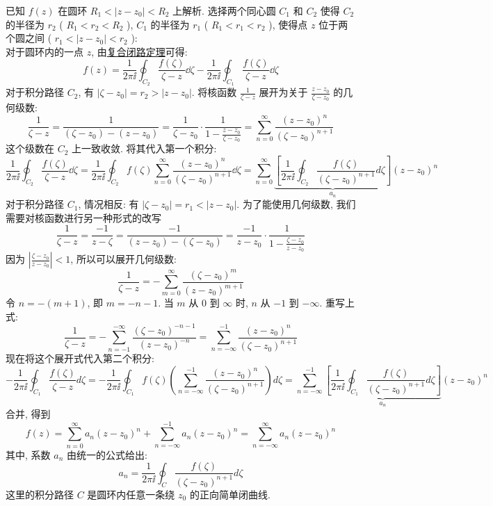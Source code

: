 \documentclass[UTF8]{ctexart}
\begin{document}
        \begin{prf}
            已知  \(f(z)\)  在圆环  \(R_1 < |z - z_0| < R_2\)  上解析. 选择两个同心圆  \(C_1\)  和  \(C_2\)  使得  \(C_2\)  的半径为  \(r_2\)  ( \(R_1 < r_2 < R_2\) ),  \(C_1\)  的半径为  \(r_1\)  ( \(R_1 < r_1 < r_2\) ), 使得点  \(z\)  位于两个圆之间 ( \(r_1 < |z - z_0| < r_2\) ):\\
            对于圆环内的一点  \(z\), 由\hyperref[thm:CombinedClosedCircuit]{复合闭路定理}可得: 
            \[f(z) = \frac{1}{2\pi\ii} \oint_{C_2} \frac{f(\zeta)}{\zeta - z} \dd\zeta - \frac{1}{2\pi\ii} \oint_{C_1} \frac{f(\zeta)}{\zeta - z}  \dd\zeta\]
            对于积分路径  \(C_2\), 有  \(|\zeta - z_0| = r_2 > |z - z_0|\). 将核函数  \(\frac{1}{\zeta - z}\)  展开为关于  \(\frac{z-z_0}{\zeta-z_0}\)  的几何级数: 
            \[\frac{1}{\zeta - z} = \frac{1}{(\zeta - z_0) - (z - z_0)} = \frac{1}{\zeta - z_0} \cdot \frac{1}{1 - \frac{z-z_0}{\zeta-z_0}} = \sum_{n=0}^{\infty} \frac{(z - z_0)^n}{(\zeta - z_0)^{n+1}}\]
            这个级数在  \(C_2\)  上一致收敛. 将其代入第一个积分: 
            \[\frac{1}{2\pi\ii} \oint_{C_2} \frac{f(\zeta)}{\zeta - z} \dd\zeta = \frac{1}{2\pi\ii} \oint_{C_2} f(\zeta) \sum_{n=0}^{\infty} \frac{(z - z_0)^n}{(\zeta - z_0)^{n+1}} \dd\zeta = \sum_{n=0}^{\infty} \underbrace{\left[ \frac{1}{2\pi\ii} \oint_{C_2} \frac{f(\zeta)}{(\zeta - z_0)^{n+1}} d\zeta \right]}_{a_n} (z - z_0)^n\]
            对于积分路径  \(C_1\), 情况相反: 有  \(|\zeta - z_0| = r_1 < |z - z_0|\). 为了能使用几何级数, 我们需要对核函数进行另一种形式的改写
            \[\frac{1}{\zeta - z} = \frac{-1}{z - \zeta} = \frac{-1}{(z - z_0) - (\zeta - z_0)} = \frac{-1}{z - z_0} \cdot \frac{1}{1 - \frac{\zeta-z_0}{z-z_0}}\]
            因为  \(\left| \frac{\zeta-z_0}{z-z_0} \right| < 1\), 所以可以展开几何级数: 
            \[\frac{1}{\zeta - z} = -\sum_{m=0}^{\infty} \frac{(\zeta - z_0)^m}{(z - z_0)^{m+1}}\]
            令  \(n = -(m+1)\), 即  \(m = -n - 1\). 当  \(m\)  从  \(0\)  到  \(\infty\)  时,  \(n\)  从  \(-1\)  到  \(-\infty\). 重写上式: 
            \[\frac{1}{\zeta - z} = -\sum_{n=-1}^{-\infty} \frac{(\zeta - z_0)^{-n-1}}{(z - z_0)^{-n}} = \sum_{n=-\infty}^{-1} \frac{(z - z_0)^n}{(\zeta - z_0)^{n+1}}\]
            现在将这个展开式代入第二个积分: 
            \[-\frac{1}{2\pi\ii} \oint_{C_1} \frac{f(\zeta)}{\zeta - z}  d\zeta = -\frac{1}{2\pi\ii} \oint_{C_1} f(\zeta) \left( \sum_{n=-\infty}^{-1} \frac{(z - z_0)^n}{(\zeta - z_0)^{n+1}} \right) d\zeta = \sum_{n=-\infty}^{-1} \underbrace{\left[ \frac{1}{2\pi\ii} \oint_{C_1} \frac{f(\zeta)}{(\zeta - z_0)^{n+1}} d\zeta \right]}_{a_n} (z - z_0)^n\]
            合并, 得到
            \[f(z) = \sum_{n=0}^{\infty} a_n (z - z_0)^n + \sum_{n=-\infty}^{-1} a_n (z - z_0)^n = \sum_{n=-\infty}^{\infty} a_n (z - z_0)^n\]
            其中, 系数  \(a_n\)  由统一的公式给出: 
            \[a_n = \frac{1}{2\pi\ii} \oint_C \frac{f(\zeta)}{(\zeta - z_0)^{n+1}}  d\zeta\]
            这里的积分路径  \(C\)  是圆环内任意一条绕  \(z_0\)  的正向简单闭曲线. 
        \end{prf}
\end{document}
